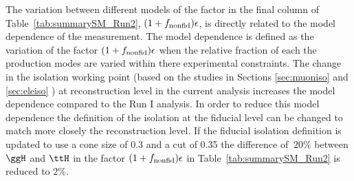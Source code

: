 The variation between different models of the factor in the final column of Table~\ref{tab:summarySM_Run2}, $(1+f_{\rm{nonfid}})\epsilon$, is directly
related to the model dependence of the measurement. The model dependence is defined as the variation of the factor
$(1+f_{\rm{nonfid}})\epsilon$ when the relative fraction of each the production modes are varied within there experimental constraints. The change
in the isolation working point (based on the studies in Sections \ref{sec:muoniso} and \ref{sec:eleiso} ) at reconstruction level in the current analysis increases the model dependence compared to the Run I analysis.
In order to reduce this model dependence the definition of the isolation at the fiducial level can be changed to match more closely the reconstruction
level. If the fiducial isolation definition is updated to use a cone size of 0.3 and a cut of 0.35 the difference 
of $~20\%$ between $\ggH$ and $\ttH$ in the factor $(1+f_{\rm{nonfid}})\epsilon$ in Table~\ref{tab:summarySM_Run2} is reduced to $2\%$.

